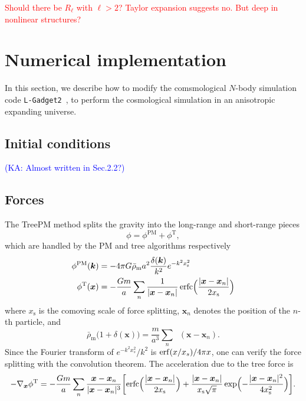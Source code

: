 \documentclass[a4paper,11pt]{article}
\DeclareMathOperator{\deltaD}{\delta^\mathrm{D}}
\DeclareMathOperator{\erfc}{erfc}
\newcommand{\vx}{{\bm x}}
\newcommand{\vk}{{\bm k}}
\newcommand{\rhobarm}{{\bar\rho_\mathrm{m}}}
\newcommand{\Tree}{\mathrm{T}}
\newcommand{\PM}{\mathrm{PM}}
\newcommand{\xs}{x_\mathrm{s}}
\newcommand{\HL}[1]{\textcolor{red}{#1}} %
\newcommand{\KA}[1]{\textcolor{Blue}{(KA: #1)}}
\begin{document}
\HL{Should there be $R_\ell$ with $\ell>2$? Taylor expansion suggests
no. But deep in nonlinear structures?}



\section{Numerical implementation}
\label{sec:num}
In this section, we describe how to modify
the comsmological $N$-body simulation code \texttt{L-Gadget2}~\cite{Springel:2005},
to perform the cosmological simulation in an anisotropic expanding universe.


\subsection{Initial conditions}
\label{sub:ics}

\KA{Almost written in Sec.2.2?}


\subsection{Forces}
\label{sub:treepm}

The TreePM method splits the gravity into the long-range and short-range pieces
\begin{equation}
    \phi = \phi^\PM + \phi^\Tree,
\end{equation}
which are handled by the PM and tree algorithms respectively \cite{Bagla02,
BaglaRay03}
\begin{align}
    \phi^\PM(\vk) &= - 4\pi G \rhobarm a^2
        \frac{\delta(\vk)}{k^2} e^{- k^2 \xs^2} \\
    \phi^\Tree(\vx) &= - \frac{G m}a \sum_n \frac1{|\vx-\vx_n|}
    \erfc \Bigl( \frac{|\vx-\vx_n|}{2 \xs} \Bigr)
\end{align}
where $\xs$ is the comoving scale of force splitting,
$\vx_n$ denotes the position of the $n$-th particle,
and
\begin{equation}
    \rhobarm \bigl( 1 + \delta(\vx) \bigr)
    = \frac{m}{a^3} \sum_n \deltaD(\vx-\vx_n).
\end{equation}
Since the Fourier transform of $e^{- k^2 x_s^2} / k^2$ is ${\rm erf}(x / x_s) / 4\pi x$,
one can verify the force splitting with the convolution theorem.
The acceleration due to the tree force is
\begin{equation}
    - \nabla_\vx \phi^\Tree = - \frac{G m}a \sum_n
    \frac{\vx - \vx_n}{|\vx - \vx_n|^3}
    \biggl[ \erfc \Bigl( \frac{|\vx - \vx_n|}{2 \xs} \Bigr)
            + \frac{|\vx - \vx_n|}{\xs \sqrt\pi}
            \exp \Bigl( - \frac{|\vx - \vx_n|^2}{4 \xs^2} \Bigr) \biggr].
\end{equation}
\end{document}
